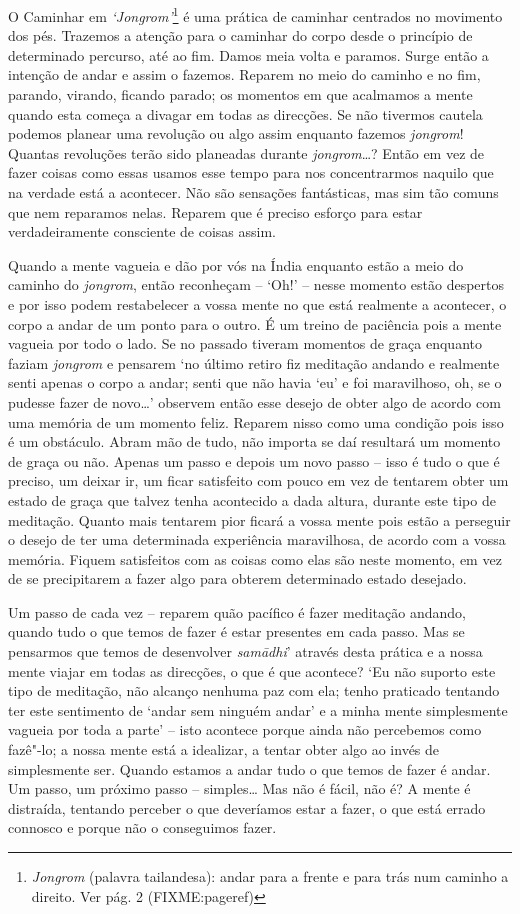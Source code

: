 O Caminhar em \emph{`Jongrom'}\footnote{%
  \emph{Jongrom} (palavra tailandesa): andar para a frente e para trás num
  caminho a direito. Ver pág. 2 (FIXME:pageref)}
é uma prática de caminhar centrados no
movimento dos pés. Trazemos a atenção para o caminhar do corpo desde o
princípio de determinado percurso, até ao fim. Damos meia volta e
paramos. Surge então a intenção de andar e assim o fazemos. Reparem no
meio do caminho e no fim, parando, virando, ficando parado; os momentos
em que acalmamos a mente quando esta começa a divagar em todas as
direcções. Se não tivermos cautela podemos planear uma revolução ou algo
assim enquanto fazemos \emph{jongrom}! Quantas revoluções terão sido
planeadas durante \emph{jongrom}\ldots{}? Então em vez de fazer coisas
como essas usamos esse tempo para nos concentrarmos naquilo que na
verdade está a acontecer. Não são sensações fantásticas, mas sim tão
comuns que nem reparamos nelas. Reparem que é preciso esforço para estar
verdadeiramente consciente de coisas assim.

Quando a mente vagueia e dão por vós na Índia enquanto estão a meio do
caminho do \emph{jongrom}, então reconheçam -- `Oh!'
-- nesse momento estão despertos e por isso podem restabelecer a vossa
mente no que está realmente a acontecer, o corpo a andar de um ponto
para o outro. É um treino de paciência pois a mente vagueia por todo o
lado. Se no passado tiveram momentos de graça enquanto faziam
\emph{jongrom} e pensarem `no último retiro fiz meditação andando e
realmente senti apenas o corpo a andar;
senti que não havia `eu' e foi maravilhoso, oh, se o pudesse fazer de
novo\ldots{}' observem então esse desejo de obter algo de acordo com uma
memória de um momento feliz. Reparem nisso como uma condição pois isso é
um obstáculo. Abram mão de tudo, não importa se daí resultará um momento
de graça ou não. Apenas um passo e depois um novo passo -- isso é tudo o
que é preciso, um deixar ir, um ficar satisfeito com pouco em vez de
tentarem obter um estado de graça que talvez tenha acontecido a dada
altura, durante este tipo de meditação. Quanto mais tentarem pior ficará
a vossa mente pois estão a perseguir o desejo de ter uma determinada
experiência maravilhosa, de acordo com a vossa memória. Fiquem
satisfeitos com as coisas como elas são neste momento, em vez de se
precipitarem a fazer algo para obterem determinado estado desejado.

Um passo de cada vez -- reparem quão pacífico é fazer meditação andando,
quando tudo o que temos de fazer é estar presentes em cada passo. Mas se
pensarmos que temos de desenvolver \emph{samādhi}' através desta prática
e a nossa mente viajar em todas as direcções, o que é que acontece? `Eu
não suporto este tipo de meditação, não alcanço nenhuma paz com ela;
tenho praticado tentando ter este sentimento de `andar sem ninguém
andar' e a minha mente simplesmente vagueia por toda a parte' -- isto
acontece porque ainda não percebemos como fazê"-lo; a nossa mente está a
idealizar, a tentar obter algo ao invés de simplesmente ser. Quando
estamos a andar tudo o que temos de fazer é andar. Um passo, um próximo
passo -- simples\ldots{} Mas não é fácil, não é? A mente é distraída,
tentando perceber o que deveríamos estar a fazer, o que está errado
connosco e porque não o conseguimos fazer.

